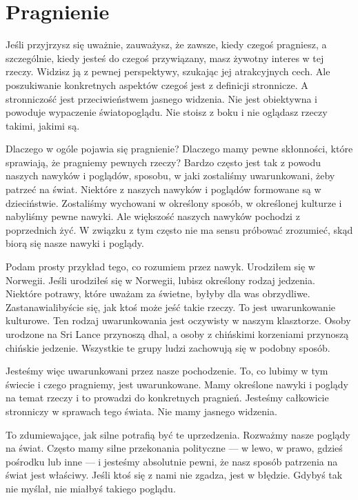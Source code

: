 \documentclass[12pt,openany]{book}
\begin{document}
\section*{Pragnienie}

Jeśli przyjrzysz się uważnie, zauważysz, że zawsze, kiedy czegoś pragniesz, a szczególnie, kiedy jesteś do czegoś przywiązany, \linebreak masz żywotny interes w tej rzeczy. Widzisz ją z pewnej perspektywy, szukając jej atrakcyjnych cech. Ale poszukiwanie konkretnych aspektów czegoś jest z definicji stronnicze. A stronniczość jest przeciwieństwem jasnego widzenia. Nie jest obiektywna i powoduje wypaczenie światopoglądu. Nie stoisz z boku i nie oglądasz rzeczy takimi, jakimi są.

Dlaczego w ogóle pojawia się pragnienie? Dlaczego mamy \linebreak pewne skłonności, które sprawiają, że pragniemy pewnych rzeczy? Bardzo często jest tak z powodu naszych nawyków i poglądów, sposobu, w jaki zostaliśmy uwarunkowani, żeby patrzeć na świat. Niektóre z naszych nawyków i poglądów formowane są w dzieciństwie. Zostaliśmy wychowani w określony sposób, w określonej kulturze i nabyliśmy pewne nawyki. Ale większość naszych nawyków pochodzi z poprzednich żyć. W związku z tym często nie ma sensu próbować zrozumieć, skąd biorą się nasze nawyki i poglądy.

Podam prosty przykład tego, co rozumiem przez nawyk. Urodziłem się w Norwegii. Jeśli urodziłeś się w Norwegii, lubisz określony rodzaj jedzenia. Niektóre potrawy, które uważam za świet\-ne, byłyby dla was obrzydliwe. Zastanawialibyście się, jak ktoś może jeść takie rzeczy. To jest uwarunkowanie kulturowe. Ten rodzaj uwarunkowania jest oczywisty w naszym klasztorze. Osoby urodzone na Sri Lance przynoszą dhal, a osoby z chińskimi korzeniami przynoszą chińskie jedzenie. Wszystkie te grupy ludzi zachowują się w podobny sposób.

Jesteśmy więc uwarunkowani przez nasze pochodzenie. To, co lubimy w tym świecie i czego pragniemy, jest uwarunkowane. Mamy określone nawyki i poglądy na temat rzeczy i to prowadzi do konkretnych pragnień. Jesteśmy całkowicie stronniczy w sprawach tego świata. Nie mamy jasnego widzenia.

To zdumiewające, jak silne potrafią być te uprzedzenia. Rozważmy nasze poglądy na świat. Często mamy silne przekonania polityczne --- w lewo, w prawo, gdzieś pośrodku lub inne --- i jesteśmy absolutnie pewni, że nasz sposób patrzenia na świat jest właściwy. Jeśli ktoś się z nami nie zgadza, jest w błędzie. Gdybyś tak nie myślał, nie miałbyś takiego poglądu.
\end{document}
